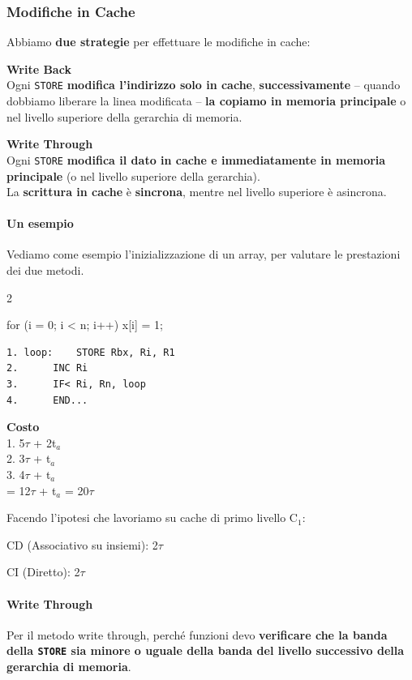 \documentclass[10pt]{report}
\begin{document}
\subsubsection{Modifiche in Cache}
Abbiamo \textbf{due strategie} per effettuare le modifiche in cache:
\begin{list}{}{}
	\item \textbf{Write Back}\\
	Ogni \texttt{STORE} \textbf{modifica l'indirizzo solo in cache}, \textbf{successivamente} -- quando dobbiamo liberare la linea modificata -- \textbf{la copiamo in memoria principale} o nel livello superiore della gerarchia di memoria.
	\item \textbf{Write Through}\\
	Ogni \texttt{STORE} \textbf{modifica il dato in cache e immediatamente in memoria principale} (o nel livello superiore della gerarchia).\\
	La \textbf{scrittura in cache} è \textbf{sincrona}, mentre nel livello superiore è asincrona.
\end{list}
\paragraph{Un esempio} Vediamo come esempio l'inizializzazione di un array, per valutare le prestazioni dei due metodi.
\begin{multicols}{2}
\begin{C}
for (i = 0; i < n; i++) x[i] = 1;
\end{C}
\begin{lstlisting}
1. loop:	STORE Rbx, Ri, R1
2.		INC Ri
3.		IF< Ri, Rn, loop
4.		END...
\end{lstlisting}
\columnbreak
\textbf{Costo}\\
	1. 5$\tau$ + 2t$_a$\\
	2. 3$\tau$ + t$_a$\\
	3. 4$\tau$ + t$_a$\\
	= 12$\tau$ + t$_a$ = 20$\tau$
\end{multicols}
\begin{list}{}{Facendo l'ipotesi che lavoriamo su cache di primo livello C$_1$:}
	\item CD (Associativo su insiemi): 2$\tau$
	\item CI (Diretto): 2$\tau$
\end{list}
\paragraph{Write Through} Per il metodo write through, perché funzioni devo \textbf{verificare che la banda della \texttt{STORE} sia minore o uguale della banda del livello successivo della gerarchia di memoria}.
\end{document}
